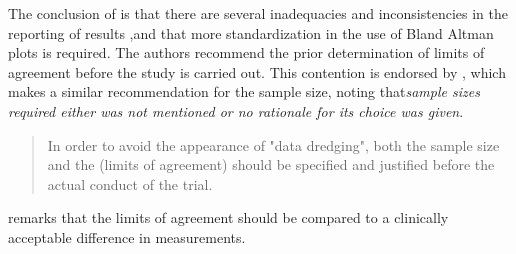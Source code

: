 \documentclass[12pt, a4paper]{report}
\theoremstyle{plain}
\theoremstyle{definition}
\theoremstyle{remark}
\begin{document}
	The conclusion of \citet{mantha} is that there are several
	inadequacies and inconsistencies in the reporting of results ,and
	that more standardization in the use of Bland Altman plots is
	required. The authors recommend the prior determination of limits
	of agreement before the study is carried out. This contention is
	endorsed by \citet{lin}, which makes a similar recommendation for
	the sample size, noting that\emph{sample sizes required either was
		not mentioned or no rationale for its choice was given}.
	
	\begin{quote}
		In order to avoid the appearance of "data dredging", both the
		sample size and the (limits of agreement) should be specified and
		justified before the actual conduct of the trial. \citep{lin}
	\end{quote}
	
	\citet{Dewitte} remarks that the limits of agreement should be
	compared to a clinically acceptable difference in measurements.
	



\end{document}

